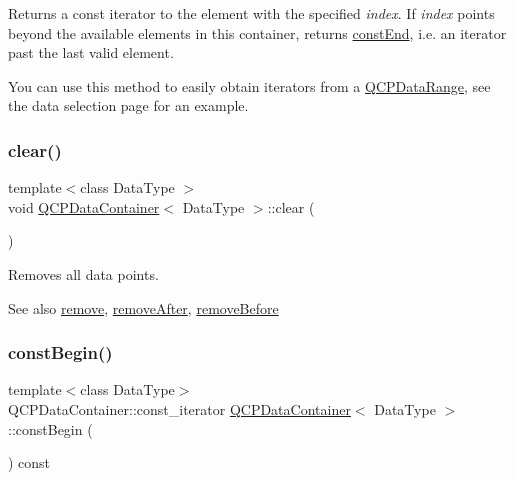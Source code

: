 Returns a const iterator to the element with the specified {\itshape index}. If {\itshape index} points beyond the available elements in this container, returns \hyperlink{class_q_c_p_data_container_aa7f7cf239b85b1a28de3d675cc5b3da1}{const\+End}, i.\+e. an iterator past the last valid element.

You can use this method to easily obtain iterators from a \hyperlink{class_q_c_p_data_range}{Q\+C\+P\+Data\+Range}, see the data selection page for an example. \mbox{\label{class_q_c_p_data_container_a7e2b29736c6fd761649bda1a54ba967f}} 
\subsubsection{\texorpdfstring{clear()}{clear()}}
{\footnotesize\ttfamily template$<$class Data\+Type $>$ \\
void \hyperlink{class_q_c_p_data_container}{Q\+C\+P\+Data\+Container}$<$ Data\+Type $>$\+::clear (\begin{DoxyParamCaption}{ }\end{DoxyParamCaption})}

Removes all data points.

\begin{DoxySeeAlso}{See also}
\hyperlink{class_q_c_p_data_container_ae5f569a120648b167efa78835f12fd38}{remove}, \hyperlink{class_q_c_p_data_container_abbe5d87ffc10b5aeffa5bb42cf03aa3c}{remove\+After}, \hyperlink{class_q_c_p_data_container_aa7f74cbce304b0369e1626c3798e1eda}{remove\+Before} 
\end{DoxySeeAlso}
\mbox{\label{class_q_c_p_data_container_a49d7622999e2de67fa2331626a3159aa}} 
\subsubsection{\texorpdfstring{const\+Begin()}{constBegin()}}
{\footnotesize\ttfamily template$<$class Data\+Type$>$ \\
Q\+C\+P\+Data\+Container\+::const\+\_\+iterator \hyperlink{class_q_c_p_data_container}{Q\+C\+P\+Data\+Container}$<$ Data\+Type $>$\+::const\+Begin (\begin{DoxyParamCaption}{ }\end{DoxyParamCaption}) const\hspace{0.3cm}{\ttfamily [inline]}}

